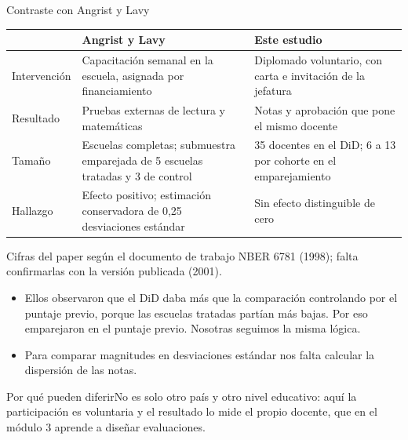 \documentclass[10pt,aspectratio=169]{beamer}
\newcommand{\sintesis}[2]{%
  \begin{block}{#1}#2\end{block}}
\begin{document}
\begin{frame}{Contraste con Angrist y Lavy}
  \begin{table}\scriptsize
    \begin{tabular}{p{2.8cm}p{5.2cm}p{5.2cm}}
      \toprule
      & \textbf{Angrist y Lavy} & \textbf{Este estudio} \\
      \midrule
      Intervención & Capacitación semanal en la escuela, asignada por financiamiento & Diplomado voluntario, con carta e invitación de la jefatura \\
      Resultado & Pruebas externas de lectura y matemáticas & Notas y aprobación que pone el mismo docente \\
      Tamaño & Escuelas completas; submuestra emparejada de 5 escuelas tratadas y 3 de control & 35 docentes en el DiD; 6 a 13 por cohorte en el emparejamiento \\
      Hallazgo & Efecto positivo; estimación conservadora de 0,25 desviaciones estándar & Sin efecto distinguible de cero \\
      \bottomrule
    \end{tabular}
  \end{table}
  {\scriptsize Cifras del paper según el documento de trabajo NBER 6781 (1998); falta confirmarlas con la versión publicada (2001).}
  \vspace{0.3em}
  \begin{itemize}\small
    \item Ellos observaron que el DiD daba más que la comparación controlando por el puntaje previo, porque las escuelas tratadas partían más bajas. Por eso emparejaron en el puntaje previo. Nosotras seguimos la misma lógica.
    \item Para comparar magnitudes en desviaciones estándar nos falta calcular la dispersión de las notas.
  \end{itemize}
  \sintesis{Por qué pueden diferir}{No es solo otro país y otro nivel educativo: aquí la participación es voluntaria y el resultado lo mide el propio docente, que en el módulo 3 aprende a diseñar evaluaciones.}
\end{frame}
\end{document}
